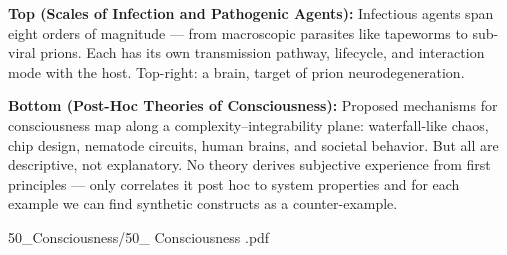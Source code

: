 \begin{SideNotePage}{
  \textbf{Top (Scales of Infection and Pathogenic Agents):}  
  Infectious agents span eight orders of magnitude — from macroscopic parasites like tapeworms to sub-viral prions. Each has its own transmission pathway, lifecycle, and interaction mode with the host. Top-right: a brain, target of prion neurodegeneration. \par

  \textbf{Bottom (Post-Hoc Theories of Consciousness):}  
  Proposed mechanisms for consciousness map along a complexity–integrability plane: waterfall-like chaos, chip design, nematode circuits, human brains, and societal behavior. But all are descriptive, not explanatory. No theory derives subjective experience from first principles — only correlates it post hoc to system properties and for each example we can find synthetic constructs as a counter-example. \par
}{50_Consciousness/50_ Consciousness .pdf}
\end{SideNotePage}


